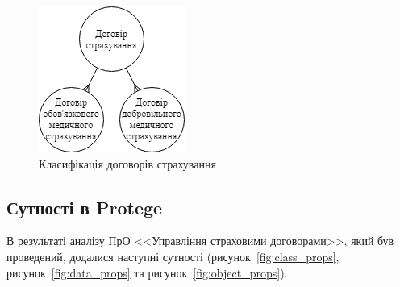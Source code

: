 \begin{figure}[H]
    \centering
        \includegraphics{idef_classification}
    \caption{Класифікація договорів страхування}
    \label{fig:idef_classification}
\end{figure}

\subsection{Сутності в Protege}
В результаті аналізу ПрО <<Управління страховими договорами>>, який був проведений, додалися наступні сутності (рисунок~\ref{fig:class_props}, рисунок~\ref{fig:data_props} та рисунок~\ref{fig:object_props}).

